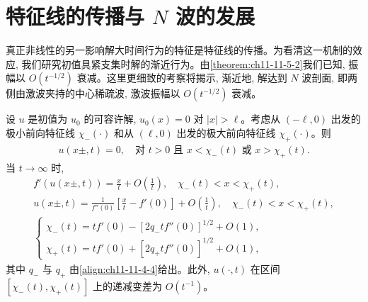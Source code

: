 \documentclass[../../main.tex]{subfiles}
\begin{document}
\section{特征线的传播与 $N$ 波的发展}\label{section:ch11-特征线传播与N波发展}

真正非线性的另一影响解大时间行为的特征是特征线的传播。为看清这一机制的效应, 我们研究初值具紧支集时解的渐近行为。由\cref{theorem:ch11-11-5-2}我们已知, 振幅以 $O(t^{-1/2})$ 衰减。这里更细致的考察将揭示, 渐近地, 解达到 $N$ 波剖面, 即两侧由激波夹持的中心稀疏波, 激波振幅以 $O(t^{-1/2})$ 衰减。

\begin{theorem}\label{theorem:ch11-11-6-1}
设 $u$ 是初值为 $u_0$ 的可容许解, $u_0(x)=0$ 对 $|x|>\ell$。考虑从 $(-\ell,0)$ 出发的极小前向特征线 $\chi_-(\cdot)$ 和从 $(\ell,0)$ 出发的极大前向特征线 $\chi_+(\cdot)$。则
\begin{align}
u(x\pm,t)=0,\quad \text{对 }t>0\text{ 且 }x<\chi_-(t)\text{ 或 }x>\chi_+(t).\label{align:ch11-11-6-1}
\end{align}
当 $t\to\infty$ 时,
\begin{align}
f'(u(x\pm,t))=\frac{x}{t}+O\left(\frac1t\right),\quad \chi_-(t)<x<\chi_+(t),\label{align:ch11-11-6-2}\\
u(x\pm,t)=\frac{1}{f''(0)}\left[\frac{x}{t}-f'(0)\right]+O\left(\frac1t\right),\quad \chi_-(t)<x<\chi_+(t),\label{align:ch11-11-6-3}\\
\begin{cases}
\chi_-(t)=tf'(0)-[2q_-tf''(0)]^{1/2}+O(1),\\
\chi_+(t)=tf'(0)+[2q_+tf''(0)]^{1/2}+O(1),
\end{cases}\label{align:ch11-11-6-4}
\end{align}
其中 $q_-$ 与 $q_+$ 由\eqref{align:ch11-11-4-4}给出。此外, $u(\cdot,t)$ 在区间 $[\chi_-(t),\chi_+(t)]$ 上的递减变差为 $O(t^{-1})$。
\end{theorem}
\end{document}
